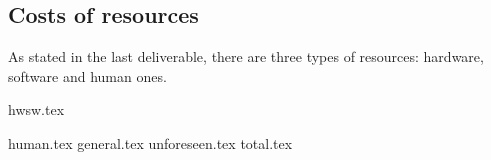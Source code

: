 \subsection{Costs of resources}
As stated in the last deliverable, there are three types of resources: hardware, software and human ones.

{hwsw.tex}

\pagebreak
{human.tex}
{general.tex}
{unforeseen.tex}
{total.tex}